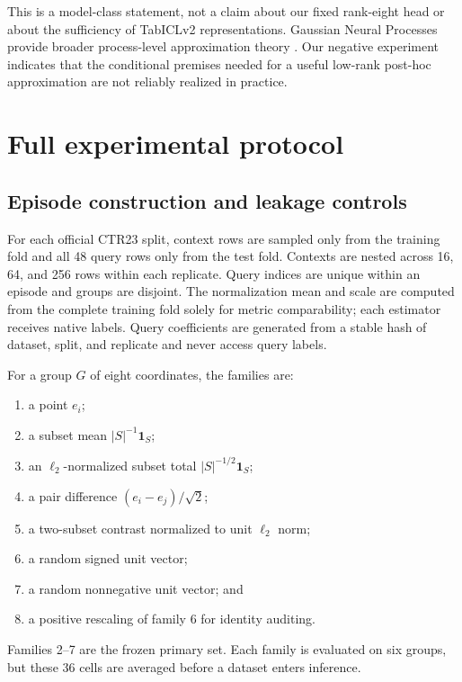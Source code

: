 This is a model-class statement, not a claim about our fixed rank-eight head or
about the sufficiency of TabICLv2 representations.  Gaussian Neural Processes
provide broader process-level approximation theory \citep{bruinsma2021gnp}.
Our negative experiment indicates that the conditional premises needed for a
useful low-rank post-hoc approximation are not reliably realized in practice.

\section{Full experimental protocol}\label{app:protocol}

\subsection{Episode construction and leakage controls}

For each official CTR23 split, context rows are sampled only from the training
fold and all 48 query rows only from the test fold.  Contexts are nested across
16, 64, and 256 rows within each replicate.  Query indices are unique within
an episode and groups are disjoint.  The normalization mean and scale are
computed from the complete training fold solely for metric comparability;
each estimator receives native labels.  Query coefficients are generated from
a stable hash of dataset, split, and replicate and never access query labels.

For a group $G$ of eight coordinates, the families are:
\begin{enumerate}
  \item a point $e_i$;
  \item a subset mean $|S|^{-1}\mathbf 1_S$;
  \item an $\ell_2$-normalized subset total $|S|^{-1/2}\mathbf 1_S$;
  \item a pair difference $(e_i-e_j)/\sqrt2$;
  \item a two-subset contrast normalized to unit $\ell_2$ norm;
  \item a random signed unit vector;
  \item a random nonnegative unit vector; and
  \item a positive rescaling of family 6 for identity auditing.
\end{enumerate}
Families 2--7 are the frozen primary set.  Each family is evaluated on six
groups, but these 36 cells are averaged before a dataset enters inference.

